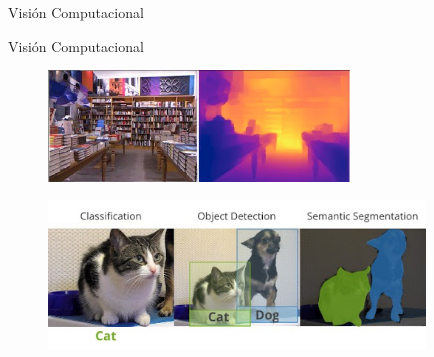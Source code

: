 \documentclass[10pt, usepdftitle=false]{beamer}
\begin{document}
\begin{frame}[fragile]{Visión Computacional}
	\begin{figure}[H]
		\captionsetup[subfloat]{labelformat=empty}
		\centering
		\hspace{2mm}
	\end{figure}
\end{frame}

\begin{frame}[fragile]{Visión Computacional}
	\begin{figure}[H]
		\captionsetup{labelformat=empty}
		\centering
		\includegraphics[width=8cm]{imagenes/depth2}
	\end{figure}
	
	\begin{figure}[H]
		\captionsetup{labelformat=empty}
		\centering
		\includegraphics[width=10cm]{imagenes/obj}
	\end{figure}
\end{frame}
\end{document}
